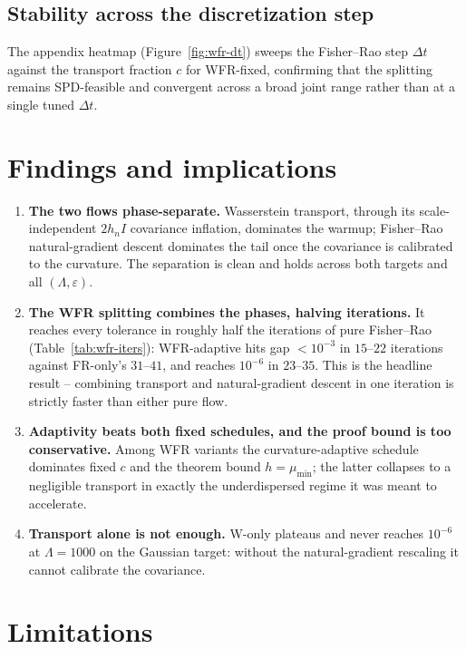 \documentclass[11pt]{article}
\begin{document}
\subsection{Stability across the discretization step}

The appendix heatmap (Figure~\ref{fig:wfr-dt}) sweeps the Fisher--Rao step
$\Delta t$ against the transport fraction $c$ for WFR-fixed, confirming that the
splitting remains SPD-feasible and convergent across a broad joint range rather
than at a single tuned $\Delta t$.

\section{Findings and implications}
\label{sec:findings}

\begin{enumerate}
\item \textbf{The two flows phase-separate.} Wasserstein transport, through its
scale-independent $2h_nI$ covariance inflation, dominates the warmup; Fisher--Rao
natural-gradient descent dominates the tail once the covariance is calibrated to
the curvature. The separation is clean and holds across both targets and all
$(\Lambda,\varepsilon)$.
\item \textbf{The WFR splitting combines the phases, halving iterations.} It
reaches every tolerance in roughly half the iterations of pure Fisher--Rao
(Table~\ref{tab:wfr-iters}): WFR-adaptive hits gap $<10^{-3}$ in $15$--$22$
iterations against FR-only's $31$--$41$, and reaches $10^{-6}$ in $23$--$35$.
This is the headline result -- combining transport and natural-gradient descent
in one iteration is strictly faster than either pure flow.
\item \textbf{Adaptivity beats both fixed schedules, and the proof bound is too
conservative.} Among WFR variants the curvature-adaptive schedule dominates fixed
$c$ and the theorem bound $h=\mu_{\min}$; the latter collapses to a negligible
transport in exactly the underdispersed regime it was meant to accelerate.
\item \textbf{Transport alone is not enough.} W-only plateaus and never reaches
$10^{-6}$ at $\Lambda=1000$ on the Gaussian target: without the natural-gradient
rescaling it cannot calibrate the covariance.
\end{enumerate}

\section{Limitations}
\label{sec:limitations}
\end{document}
